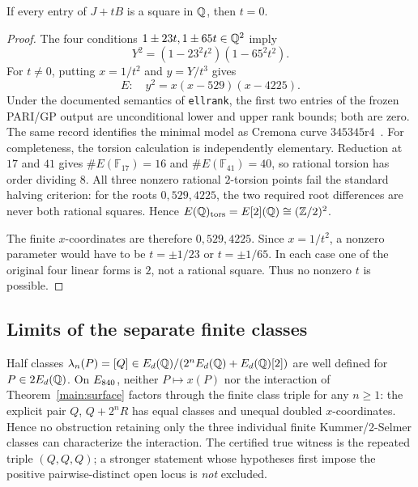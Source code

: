 \begin{proposition}\label{prop:bremnershadow}
If every entry of $J+tB$ is a square in $\mathbb{Q}$, then $t=0$.
\end{proposition}

\begin{proof}
The four conditions $1\pm23t,1\pm65t\in\mathbb{Q}^2$ imply
\[
 Y^2=(1-23^2t^2)(1-65^2t^2).
\]
For $t\ne0$, putting $x=1/t^2$ and $y=Y/t^3$ gives
\[
 E:\quad y^2=x(x-529)(x-4225).
\]
Under the documented semantics of \texttt{ellrank}, the first two entries
of the frozen PARI/GP output are unconditional lower and upper rank bounds;
both are zero. The same record identifies the minimal model as Cremona curve
$345345\mathrm{r}4$~\cite{PARI,CREMONA}. For completeness, the torsion
calculation is independently elementary. Reduction at $17$ and $41$ gives
$\#E(\mathbb F_{17})=16$ and $\#E(\mathbb F_{41})=40$, so rational torsion has order
dividing $8$. All three nonzero rational $2$-torsion points fail the
standard halving criterion: for the roots $0,529,4225$, the two required
root differences are never both rational squares. Hence
$E(\mathbb{Q})_{\rm tors}=E[2](\mathbb{Q})\cong(\mathbb{Z}/2)^2$.

The finite $x$-coordinates are therefore $0,529,4225$. Since
$x=1/t^2$, a nonzero parameter would have to be
$t=\pm1/23$ or $t=\pm1/65$. In each case one of the original four linear
forms is $2$, not a rational square. Thus no nonzero $t$ is possible.
\end{proof}

\subsection{Limits of the separate finite classes}

\begin{theorem}\label{main:kummerstop}
Half classes $\lambda_n(P)=[Q]\in E_d(\mathbb{Q})/(2^nE_d(\mathbb{Q})+E_d(\mathbb{Q})[2])$ are well
defined for $P\in2E_d(\mathbb{Q})$. On $E_{840}$, neither $P\mapsto x(P)$ nor the
interaction of Theorem~\ref{main:surface} factors through the finite class
triple for any $n\ge1$: the explicit pair $Q$, $Q+2^nR$ has equal classes
and unequal doubled $x$-coordinates. Hence no obstruction retaining only
the three individual finite Kummer/2-Selmer classes can characterize the
interaction. The certified true witness is the repeated triple $(Q,Q,Q)$;
a stronger statement whose hypotheses first impose the positive
pairwise-distinct open locus is \emph{not} excluded.
\end{theorem}

